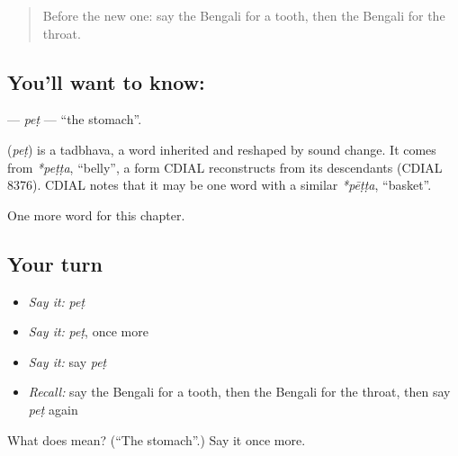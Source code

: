 \label{lesson:BN-C42-pet}



\begin{quote}
Before the new one: say the Bengali for a tooth, then the Bengali for the throat.
\end{quote}

\subsection*{You'll want to know: }
\textbf{} — \emph{peṭ} — \textquotedblleft{}the stomach\textquotedblright{}.

\begin{cousinweb}
\textbf{} (\emph{peṭ}) is a tadbhava, a word inherited and reshaped by sound change. It comes from \emph{*peṭṭa}, \textquotedblleft{}belly\textquotedblright{}, a form CDIAL reconstructs from its descendants (CDIAL 8376). CDIAL notes that it may be one word with a similar \emph{*pēṭṭa}, \textquotedblleft{}basket\textquotedblright{}.
\end{cousinweb}

\begin{grammarlens}[title={What you've built}]
One more word for this chapter.
\end{grammarlens}

\subsection*{Your turn}
\begin{itemize}
\raggedright
  \item \emph{Say it:} \emph{peṭ}
  \item \emph{Say it:} \emph{peṭ}, once more
  \item \emph{Say it:} say \emph{peṭ}
  \item \emph{Recall:} say the Bengali for a tooth, then the Bengali for the throat, then say \emph{peṭ} again
\end{itemize}

\begin{tcolorbox}[breakable,colback=teal!4,colframe=teal!35!black,title={Before you move on}]
What does  mean? (\textquotedblleft{}The stomach\textquotedblright{}.) Say it once more.
\end{tcolorbox}
